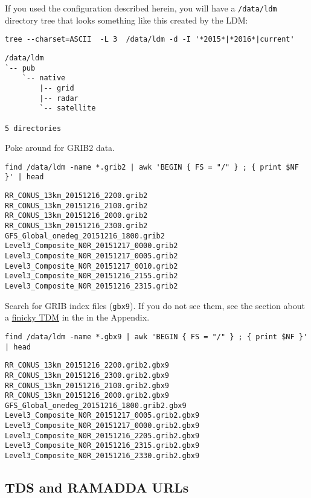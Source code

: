 \documentclass{article}
\begin{document}
If you used the configuration described herein, you will have a \texttt{/data/ldm} directory tree that looks something like this created by the LDM:

\begin{verbatim}
tree --charset=ASCII  -L 3  /data/ldm -d -I '*2015*|*2016*|current'
\end{verbatim}

\begin{verbatim}
/data/ldm
`-- pub
    `-- native
        |-- grid
        |-- radar
        `-- satellite

5 directories
\end{verbatim}

Poke around for GRIB2 data.

\begin{verbatim}
find /data/ldm -name *.grib2 | awk 'BEGIN { FS = "/" } ; { print $NF }' | head
\end{verbatim}

\begin{verbatim}
RR_CONUS_13km_20151216_2200.grib2
RR_CONUS_13km_20151216_2100.grib2
RR_CONUS_13km_20151216_2000.grib2
RR_CONUS_13km_20151216_2300.grib2
GFS_Global_onedeg_20151216_1800.grib2
Level3_Composite_N0R_20151217_0000.grib2
Level3_Composite_N0R_20151217_0005.grib2
Level3_Composite_N0R_20151217_0010.grib2
Level3_Composite_N0R_20151216_2155.grib2
Level3_Composite_N0R_20151216_2315.grib2
\end{verbatim}

Search for GRIB index files (\texttt{gbx9}). If you do not see them, see the section about a \hyperref[orgtarget8]{finicky TDM} in the in the Appendix.

\begin{verbatim}
find /data/ldm -name *.gbx9 | awk 'BEGIN { FS = "/" } ; { print $NF }' | head
\end{verbatim}

\begin{verbatim}
RR_CONUS_13km_20151216_2200.grib2.gbx9
RR_CONUS_13km_20151216_2300.grib2.gbx9
RR_CONUS_13km_20151216_2100.grib2.gbx9
RR_CONUS_13km_20151216_2000.grib2.gbx9
GFS_Global_onedeg_20151216_1800.grib2.gbx9
Level3_Composite_N0R_20151217_0005.grib2.gbx9
Level3_Composite_N0R_20151217_0000.grib2.gbx9
Level3_Composite_N0R_20151216_2205.grib2.gbx9
Level3_Composite_N0R_20151216_2315.grib2.gbx9
Level3_Composite_N0R_20151216_2330.grib2.gbx9
\end{verbatim}

\subsection{TDS and RAMADDA URLs}
\label{sec:orgheadline44}
\end{document}

